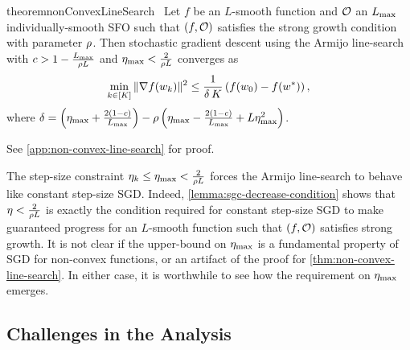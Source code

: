 \begin{restatable}{theorem}{nonConvexLineSearch}~\label{thm:non-convex-line-search}
    Let \( f \) be an \( L \)-smooth function and \( \oracle{} \) an \( \Lmax \) individually-smooth \ac{SFO} such that \( \rbr{f, \oracle{}} \) satisfies the strong growth condition with parameter \( \sgc \).
    Then stochastic gradient descent using the Armijo line-search with \( c >  1 - \frac{\Lmax}{\sgc L}\) and \( \etamax <  \frac{2}{\sgc L} \) converges as
    \[ \min_{k \in [K]} \norm{\grad(\wk)}^2 \leq \frac{1}{\delta \, K} \rbr{f(w_0) - f(\wopt)}, \]
    where \( \delta = \rbr{\etamax + \frac{2(1-c)}{\Lmax}} - \sgc \rbr{\etamax - \frac{2(1-c)}{\Lmax} + L \etamax^2} \).
\end{restatable}
\noindent See \autoref{app:non-convex-line-search} for proof. \hfill \break 

The step-size constraint \( \etak \leq \etamax < \frac{2}{\sgc L} \) forces the Armijo line-search to behave like constant step-size \ac{SGD}.
Indeed, \autoref{lemma:sgc-decrease-condition} shows that \( \eta < \frac{2}{\sgc L} \) is exactly the condition required for constant step-size \ac{SGD} to make guaranteed progress for an \( L \)-smooth function such that \( \rbr{f, \oracle{}} \) satisfies strong growth.
It is not clear if the upper-bound on \( \etamax \) is a fundamental property of \ac{SGD} for non-convex functions, or an artifact of the proof for \autoref{thm:non-convex-line-search}. 
In either case, it is worthwhile to see how the requirement on \( \etamax \) emerges.

\subsection{Challenges in the Analysis}\label{sec:ls-nc-challenges}

